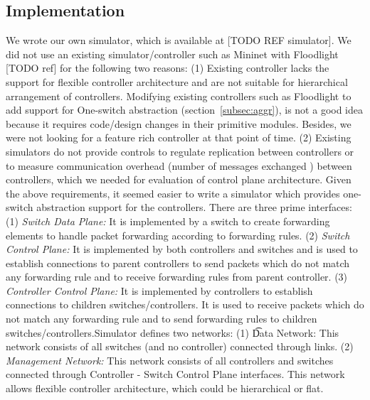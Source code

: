\documentclass[10pt, twocolumn]{article}
\begin{document}
\subsection{Implementation}
\label{sec:implementation}
We wrote our own simulator, which is available at [TODO REF simulator]. We did not use an existing simulator/controller such as Mininet with Floodlight [TODO ref] for the following two reasons: (1) Existing controller lacks the support for flexible controller architecture and are not suitable for hierarchical arrangement of controllers. Modifying existing controllers such as Floodlight to add support for One-switch abstraction (section~\ref{subsec:aggr}), is not a good idea because it requires code/design changes in their primitive modules. Besides, we were not looking for a feature rich controller at that point of time. (2) Existing simulators do not provide controls to regulate replication between controllers or to measure communication overhead (number of messages exchanged ) between controllers, which we needed for evaluation of control plane architecture. Given the above requirements, it seemed easier to write a simulator which provides one-switch abstraction support for the controllers. There are three prime interfaces: (1) {\it Switch Data Plane:} It is implemented by a switch to create forwarding elements to handle packet forwarding according to forwarding rules. (2) {\it Switch Control Plane:} It is implemented by both controllers and switches and is used to establish connections to parent controllers to send packets which do not match any forwarding rule and to receive forwarding rules from parent controller. (3) {\it Controller Control Plane:} It is implemented by controllers to establish connections to children switches/controllers. It is used to receive packets which do not match any forwarding rule and to send forwarding rules to children switches/controllers.Simulator defines two networks: (1) {\t Data Network:} This network consists of all switches (and no controller) connected through links. (2) {\it Management Network:} This network consists of all controllers and switches connected through Controller - Switch Control Plane interfaces. This network allows flexible controller architecture, which could be hierarchical or flat.
\end{document}
